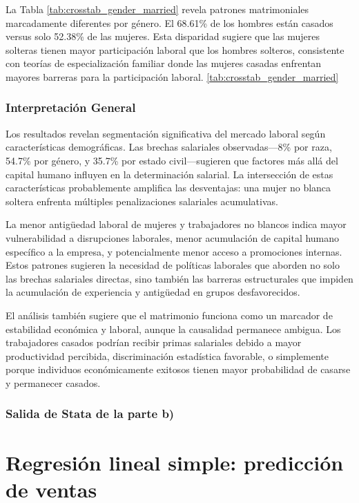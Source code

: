 \documentclass[12pt]{article}
\begin{document}
La Tabla \ref{tab:crosstab_gender_married} revela patrones matrimoniales marcadamente diferentes por género. El 68.61\% de los hombres están casados versus solo 52.38\% de las mujeres. Esta disparidad sugiere que las mujeres solteras tienen mayor participación laboral que los hombres solteros, consistente con teorías de especialización familiar donde las mujeres casadas enfrentan mayores barreras para la participación laboral.
\ref{tab:crosstab_gender_married}

\subsubsection*{Interpretación General}

Los resultados revelan segmentación significativa del mercado laboral según características demográficas. Las brechas salariales observadas—8\% por raza, 54.7\% por género, y 35.7\% por estado civil—sugieren que factores más allá del capital humano influyen en la determinación salarial. La intersección de estas características probablemente amplifica las desventajas: una mujer no blanca soltera enfrenta múltiples penalizaciones salariales acumulativas.

La menor antigüedad laboral de mujeres y trabajadores no blancos indica mayor vulnerabilidad a disrupciones laborales, menor acumulación de capital humano específico a la empresa, y potencialmente menor acceso a promociones internas. Estos patrones sugieren la necesidad de políticas laborales que aborden no solo las brechas salariales directas, sino también las barreras estructurales que impiden la acumulación de experiencia y antigüedad en grupos desfavorecidos.

El análisis también sugiere que el matrimonio funciona como un marcador de estabilidad económica y laboral, aunque la causalidad permanece ambigua. Los trabajadores casados podrían recibir primas salariales debido a mayor productividad percibida, discriminación estadística favorable, o simplemente porque individuos económicamente exitosos tienen mayor probabilidad de casarse y permanecer casados.

\subsubsection*{Salida de Stata de la parte b)}

%

\section{Regresión lineal simple: predicción de ventas}
\end{document}
